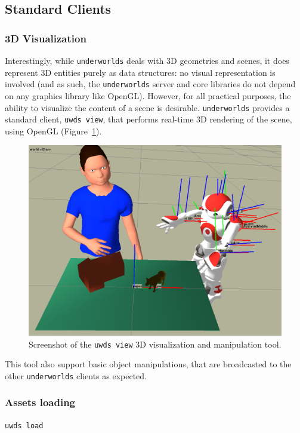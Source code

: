 \documentclass[letterpaper, 10 pt, conference]{ieeeconf}  %
\newcommand{\uwds}{{\tt underworlds}\xspace}
\begin{document}
\subsection{Standard Clients}


\subsubsection{3D Visualization}

Interestingly, while \uwds deals with 3D geometries and scenes, it does
represent 3D entities purely as data structures: no visual representation is
involved (and as such, the \uwds server and core libraries do not depend on any
graphics library like OpenGL). However, for all practical purposes, the ability
to visualize the content of a scene is desirable. \uwds provides a standard
client, {\tt uwds view}, that performs real-time 3D rendering of the scene,
using OpenGL (Figure~\ref{fig|uwds-view}).

\begin{figure}
    \centering
    \includegraphics[width=0.9\linewidth]{uwds-screenshot}
    \caption{Screenshot of the {\tt uwds view} 3D visualization and manipulation
    tool.}
    \label{fig|uwds-view}
\end{figure}

This tool also support basic object manipulations, that are broadcasted to the
other \uwds clients as expected.

\subsubsection{Assets loading}

{\tt uwds load}
\end{document}
